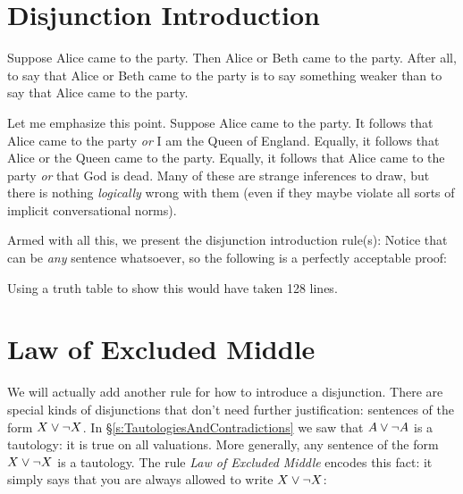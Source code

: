 \section{Disjunction Introduction}
Suppose Alice came to the party. Then Alice or Beth came to the party. After all, to say that Alice or Beth came to the party is to say something weaker than to say that Alice came to the party.

Let me emphasize this point. Suppose Alice came to the party. It follows that Alice came to the party \emph{or} I am the Queen of England. Equally, it follows that Alice or the Queen came to the party.  Equally, it follows that Alice came to the party \emph{or} that God is dead. Many of these are strange inferences to draw, but there is nothing \emph{logically} wrong with them (even if they maybe violate all sorts of implicit conversational norms).

Armed with all this, we present the disjunction introduction rule(s):
Notice that \metaY can be \emph{any} sentence whatsoever, so the following is a perfectly acceptable proof:
\begin{fitchproof}
\end{fitchproof}
Using a truth table to show this would have taken 128 lines.


\section{Law of Excluded Middle}\label{sec:LEM}
We will actually add another rule for how to introduce a disjunction. There are special kinds of disjunctions that don't need further justification: sentences of the form $X\vee\neg X$.
In \S\ref{s:TautologiesAndContradictions} we saw that $A\vee\neg A$ is a tautology: it is true on all valuations. More generally, any sentence of the form $X\vee\neg X$ is a tautology.
The rule \emph{Law of Excluded Middle} encodes this fact: it simply says that you are always allowed to write $X\vee\neg X$:

